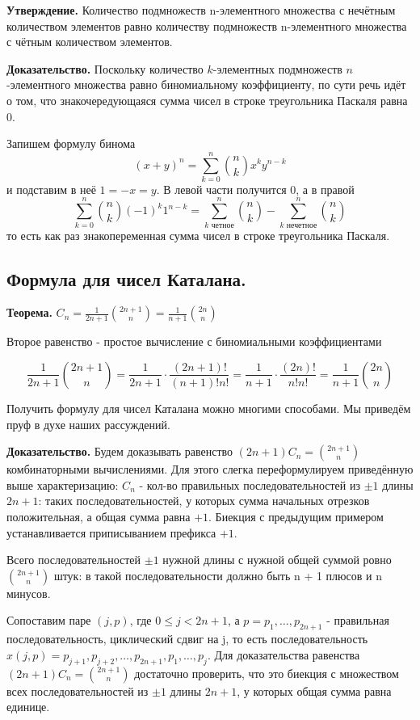 \documentclass[a4paper, 10pt]{article}
\begin{document}
\textbf{Утверждение.} Количество подмножеств n-элементного множества с нечётным количеством элементов равно количеству подмножеств n-элементного множества с чётным количеством элементов.

\textbf{Доказательство.} Поскольку количество $k$-элементных подмножеств $n$-элементного множества равно биномиальному коэффициенту, по сути речь идёт о том, что знакочередующаяся сумма чисел в строке треугольника Паскаля равна 0.

Запишем формулу бинома $$(x + y)^n = \sum^n_{k = 0}\binom{n}{k}x^ky^{n-k}$$ и подставим в неё $1 = -x = y$. В левой части получится 0, а в правой $$\sum^n_{k = 0}\binom{n}{k}(-1)^{k}1^{n-k} = \sum^n_{k \text{ четное}}\binom{n}{k} - \sum^n_{k \text{ нечетное}}\binom{n}{k}$$ то есть как раз знакопеременная сумма чисел в строке треугольника Паскаля.

\subsection{Формула для чисел Каталана.}

\textbf{Теорема.} $C_n = \frac{1}{2n + 1} \binom{2n + 1}{n} = \frac{1}{n + 1} \binom{2n}{n}$

Второе равенство - простое вычисление с биномиальными коэффициентами

$$\frac{1}{2n + 1} \binom{2n + 1}{n} = \frac{1}{2n + 1} \cdot \frac{(2n + 1)!}{(n + 1)!n!} = \frac{1}{n + 1} \cdot \frac{(2n)!}{n!n!}  = \frac{1}{n + 1} \binom{2n}{n}$$

Получить формулу для чисел Каталана можно многими способами. Мы приведём пруф в духе наших рассуждений.

\textbf{Доказательство. } Будем доказывать равенство $(2n + 1)C_n = \binom{2n + 1}{n}$ комбинаторными вычислениями. Для этого слегка переформулируем приведённую выше характеризацию: $C_n$ - кол-во правильных последовательностей из $\pm 1$ длины $2n + 1$: таких последовательностей, у которых сумма начальных отрезков положительная, а общая сумма равна $+1$. Биекция с предыдущим примером устанавливается приписыванием префикса $+1$.

Всего последовательностей $\pm 1$ нужной длины с нужной общей суммой ровно $\binom{2n + 1}{n}$ штук: в такой последовательности должно быть n + 1 плюсов и n минусов.

Сопоставим паре $(j, p)$, где $0 \leqslant j < 2n + 1$, а $p = p_1, \dots, p_{2n + 1}$ - правильная последовательность, циклический сдвиг на j, то есть последовательность $x(j, p) = p_{j + 1}, p_{j + 2}, \dots, p_{2n + 1}, p_1, \dots, p_j$. Для доказательства равенства $(2n + 1) C_n = \binom{2n + 1}{n}$ достаточно проверить, что это биекция с множеством всех последовательностей из $\pm 1$ длины $2n + 1$, у которых общая сумма равна единице.
\end{document}
